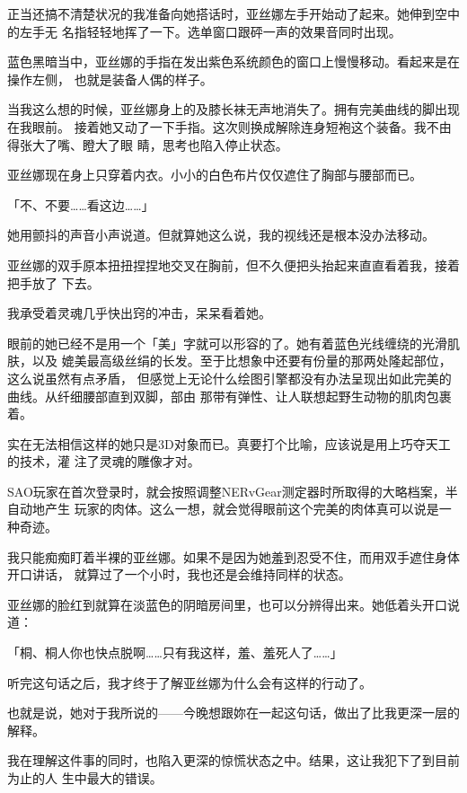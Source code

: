 \documentclass[11pt]{book}
\begin{document}
正当还搞不清楚状况的我准备向她搭话时，亚丝娜左手开始动了起来。她伸到空中的左手无
名指轻轻地挥了一下。选单窗口跟砰一声的效果音同时出现。

蓝色黑暗当中，亚丝娜的手指在发出紫色系统颜色的窗口上慢慢移动。看起来是在操作左侧，
也就是装备人偶的样子。

当我这么想的时候，亚丝娜身上的及膝长袜无声地消失了。拥有完美曲线的脚出现在我眼前。
接着她又动了一下手指。这次则换成解除连身短袍这个装备。我不由得张大了嘴、瞪大了眼
睛，思考也陷入停止状态。

亚丝娜现在身上只穿着内衣。小小的白色布片仅仅遮住了胸部与腰部而已。

「不、不要……看这边……」

她用颤抖的声音小声说道。但就算她这么说，我的视线还是根本没办法移动。

亚丝娜的双手原本扭扭捏捏地交叉在胸前，但不久便把头抬起来直直看着我，接着把手放了
下去。

我承受着灵魂几乎快出窍的冲击，呆呆看着她。

眼前的她已经不是用一个「美」字就可以形容的了。她有着蓝色光线缠绕的光滑肌肤，以及
媲美最高级丝绢的长发。至于比想象中还要有份量的那两处隆起部位，这么说虽然有点矛盾，
但感觉上无论什么绘图引擎都没有办法呈现出如此完美的曲线。从纤细腰部直到双脚，部由
那带有弹性、让人联想起野生动物的肌肉包裹着。

实在无法相信这样的她只是3D对象而已。真要打个比喻，应该说是用上巧夺天工的技术，灌
注了灵魂的雕像才对。

SAO玩家在首次登录时，就会按照调整NERvGear测定器时所取得的大略档案，半自动地产生
玩家的肉体。这么一想，就会觉得眼前这个完美的肉体真可以说是一种奇迹。

我只能痴痴盯着半裸的亚丝娜。如果不是因为她羞到忍受不住，而用双手遮住身体开口讲话，
就算过了一个小时，我也还是会维持同样的状态。














亚丝娜的脸红到就算在淡蓝色的阴暗房间里，也可以分辨得出来。她低着头开口说道：

「桐、桐人你也快点脱啊……只有我这样，羞、羞死人了……」

听完这句话之后，我才终于了解亚丝娜为什么会有这样的行动了。

也就是说，她对于我所说的——今晚想跟妳在一起这句话，做出了比我更深一层的解释。

我在理解这件事的同时，也陷入更深的惊慌状态之中。结果，这让我犯下了到目前为止的人
生中最大的错误。
\end{document}
